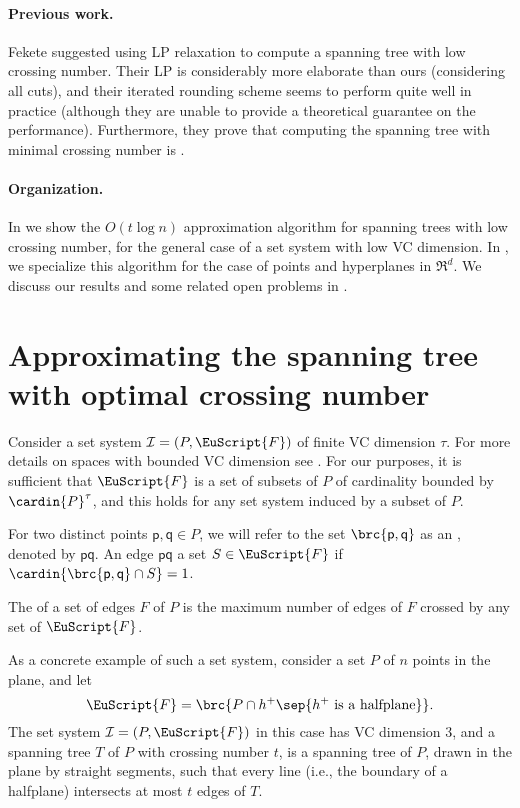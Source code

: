 \documentclass[12pt]{article}
\newcommand{\PntSet}{P}
\newcommand{\pnt}{\mathsf{p}}
\newcommand{\pntA}{\mathsf{q}}
\newcommand{\Term}[1]{\textsf{#1}}
\newcommand{\LP}{\Term{L{}P}\xspace}
\newcommand{\VC}{\Term{V{C}}\xspace}
\newcommand{\Family}{\EuScript{F}}
\newcommand{\Dim}{\tau}
\newcommand{\I}{\mathcal{I}}
\begin{document}
\paragraph{Previous work.} Fekete \etal \cite{flm-msnmt-08} suggested
using \LP relaxation to compute a spanning tree with low crossing
number. Their \LP is considerably more elaborate than ours
(considering all cuts), and their iterated rounding scheme seems to
perform quite well in practice (although they are unable to provide a
theoretical guarantee on the performance). Furthermore, they prove
that computing the spanning tree with minimal crossing number is
\NPHard.

\paragraph{Organization.}
In  we show the $O(t \log n)$ approximation
algorithm for spanning trees with low crossing number, for the general
case of a set system with low \VC dimension.  In , we
specialize this algorithm for the case of points and hyperplanes in
$\Re^d$.  We discuss our results and some related open problems in
.


\section{Approximating the spanning tree with optimal crossing number}

Consider a set system $\I = (\PntSet, \Family)$ of finite \VC
dimension $\Dim$. For more details on spaces with bounded \VC
dimension see \cite{pa-cg-95}. For our purposes, it is sufficient that
$\Family$ is a set of subsets of $\PntSet$ of cardinality bounded by
$\cardin{\PntSet}^\Dim$, and this holds for any set system induced by
a subset of $\PntSet$.

For two distinct points $\pnt, \pntA \in \PntSet$, we will refer to
the set $\brc{ \pnt, \pntA}$ as an , denoted by $\pnt
\pntA$.  An edge $\pnt \pntA$  a set $S \in \Family$ if
$\cardin{ \brc{\pnt, \pntA} \cap S} = 1$.

The  of a set of edges $F$ of $\PntSet$ is the
maximum number of edges of $F$ crossed by any set of $\Family$.

\begin{example}
    As a concrete example of such a set system, consider a set $\PntSet$
    of $n$ points in the plane, and let 
    \[
    \Family = \brc{ \PntSet \cap h^+ \sep{ h^+ \text{ is a halfplane}}}.
    \]
    The set system $\I = (\PntSet, \Family)$ in this case has \VC
    dimension $3$, and a spanning tree $T$ of $\PntSet$ with crossing
    number $t$, is a spanning tree of $\PntSet$, drawn in the plane by
    straight segments, such that every line (i.e., the boundary of a
    halfplane) intersects at most $t$ edges of $T$.
\end{example}
\end{document}
